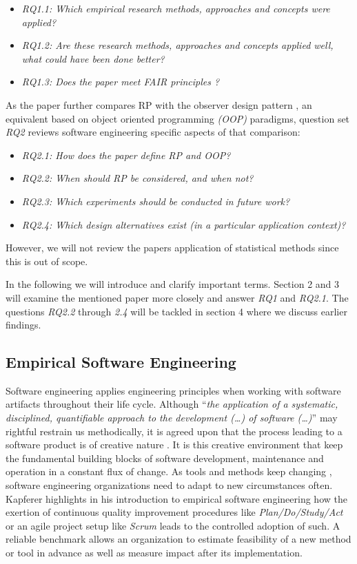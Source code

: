\documentclass[12pt,a4paper]{article}
\begin{document}
\begin{itemize}
	\item \emph{RQ1.1: Which empirical research methods, approaches and concepts were applied?}
	\item \emph{RQ1.2: Are these research methods, approaches and concepts applied well, what could have been done better?}
	\item \emph{RQ1.3: Does the paper meet FAIR principles \cite{2019arXiv190805986H} \cite{wilkinson:2016}?}
\end{itemize}

As the paper further compares RP with the observer design pattern \cite{gamma1995design}, an equivalent based on object oriented programming \emph{(OOP)} paradigms, question set \emph{RQ2} reviews software engineering specific aspects of that comparison:

\begin{itemize}
	\item \emph{RQ2.1: How does the paper define RP and OOP?}
	\item \emph{RQ2.2: When should RP be considered, and when not?}
	\item \emph{RQ2.3: Which experiments should be conducted in future work?}
	\item \emph{RQ2.4: Which design alternatives exist (in a particular application context)?}
\end{itemize}

However, we will not review the papers application of statistical methods since this is out of scope.

In the following we will introduce and clarify important terms. Section 2 and 3 will examine the mentioned paper more closely and answer \emph{RQ1} and \emph{RQ2.1}. The questions \emph{RQ2.2} through \emph{2.4} will be tackled in section 4 where we discuss earlier findings.

\subsection{Empirical Software Engineering}
Software engineering applies engineering principles when working with software artifacts \cite{159342} throughout their life cycle. Although ``\emph{the application of a systematic, disciplined, quantifiable approach to the development (\dots) of software (\dots)}'' \cite{159342} may rightful restrain us methodically, it is agreed upon that the process leading to a software product is of creative nature \cite{8051350}. It is this creative environment that keep the fundamental building blocks of software development, maintenance and operation in a constant flux of change. As tools and methods keep changing \cite{kapferer:2019:empirical}, software engineering organizations need to adapt to new circumstances often. Kapferer \cite{kapferer:2019:empirical} highlights in his introduction to empirical software engineering how the exertion of continuous quality improvement procedures like \emph{Plan/Do/Study/Act} \cite{deming} or an agile project setup like \emph{Scrum} leads to the controlled adoption of such. A reliable benchmark allows an organization to estimate feasibility of a new method or tool in advance as well as measure impact after its implementation.
\end{document}
